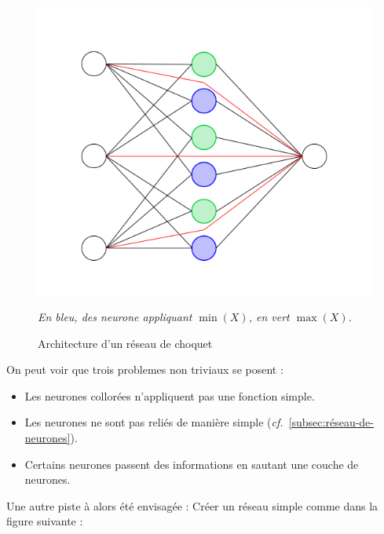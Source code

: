 \begin{figure}[H]
    \center
    \includegraphics[height=\moyen]{pict/chnet1}
	\caption{Architecture d'un réseau de choquet}
	\label{fig:chnet1}
    \begin{center}
        \textit{
        En bleu, des neurone appliquant $\min(X)$, en vert $\max(X)$.
        }
    \end{center}
\end{figure}
\vspace{-12pt}
On peut voir que trois problemes non triviaux se posent :
\begin{itemize}
    \item Les neurones collorées n'appliquent pas une fonction simple.
    \item Les neurones ne sont pas reliés de manière simple (\textit{cf.}\ \ref{subsec:réseau-de-neurones}).
    \item Certains neurones passent des informations en sautant une couche de neurones.
\end{itemize}
Une autre piste à alors été envisagée :
Créer un réseau simple comme dans la figure suivante :
